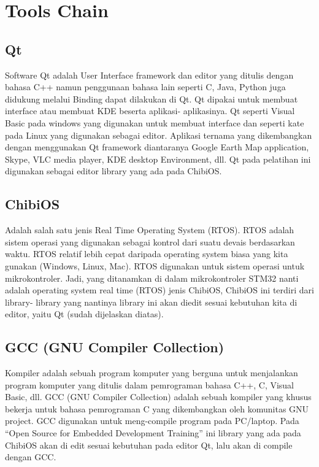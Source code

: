\documentclass[11pt,fleqn]{book} %
\begin{document}
\chapter{Tools Chain}
\section{Qt}
\hspace{10pt}Software Qt adalah User Interface framework dan editor yang ditulis dengan bahasa C++ namun penggunaan bahasa lain seperti C, Java, Python juga didukung melalui Binding dapat dilakukan di Qt. 
Qt dipakai untuk membuat interface atau membuat KDE beserta aplikasi- aplikasinya. Qt seperti Visual Basic pada windows yang digunakan untuk membuat interface dan seperti kate pada Linux yang digunakan sebagai editor. 
Aplikasi ternama yang dikembangkan dengan menggunakan Qt framework diantaranya Google Earth Map application, Skype, VLC media player, KDE desktop Environment, dll.
Qt pada pelatihan ini digunakan sebagai editor library yang ada pada ChibiOS.
\section{ChibiOS}
\hspace{10pt}Adalah salah satu jenis Real Time Operating System (RTOS).  
RTOS adalah sistem operasi yang digunakan sebagai kontrol dari suatu devais berdasarkan waktu. 
RTOS relatif lebih cepat daripada operating system biasa yang kita gunakan (Windows, Linux, Mac). RTOS digunakan untuk sistem operasi untuk mikrokontroler. 
Jadi, yang ditanamkan di dalam mikrokontroler STM32 nanti adalah operating system real time (RTOS) jenis ChibiOS, ChibiOS ini terdiri dari library- library yang nantinya library ini akan diedit sesuai kebutuhan kita di editor, yaitu Qt (sudah dijelaskan diatas).
\section{GCC (GNU Compiler Collection)}
\hspace{10pt} Kompiler adalah sebuah program komputer yang berguna untuk menjalankan program komputer yang ditulis dalam pemrograman bahasa C++, C, Visual Basic, dll.  
GCC (GNU Compiler Collection) adalah sebuah kompiler yang khusus bekerja untuk bahasa pemrograman C yang dikembangkan oleh komunitas GNU project. 
GCC digunakan untuk meng-compile program pada PC/laptop. 
Pada “Open Source for Embedded Development Training” ini library yang ada pada ChibiOS akan di edit sesuai kebutuhan pada editor Qt, lalu akan di compile dengan GCC. 
\end{document}
